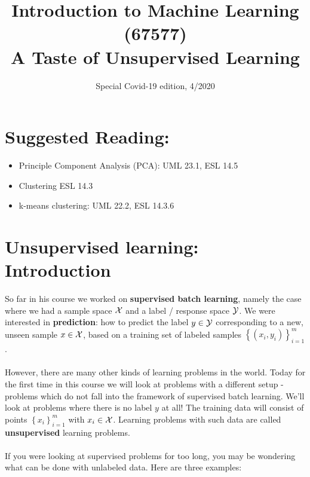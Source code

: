 \documentclass[11pt]{article}
\title{{\large{Introduction to Machine Learning (67577) \\
\vphantom{} A Taste of Unsupervised Learning}}}
\date{Special Covid-19 edition, 4/2020}
\begin{document}
\maketitle

\tableofcontents

\section*{Suggested Reading:}
\begin{itemize}
  \item Principle Component Analysis (PCA): UML 23.1, ESL 14.5
  \item Clustering ESL 14.3
  \item k-means clustering: UML 22.2, ESL 14.3.6
\end{itemize}

\section{Unsupervised learning: Introduction}

So far in his course we worked on {\bf supervised batch learning}, namely the case
where we had a sample space $\mathcal{X}$ and a label / response space $\mathcal{Y}$. We were
interested in {\bf prediction}: how to predict the label $y\in\mathcal{Y}$ corresponding
to a new, unseen
sample $x\in \mathcal{X}$, based on a training set of labeled samples 
$\left\{ (x_i,y_i) \right\}_{i=1}^m$.
\\~\\
However, there are many other kinds of learning problems in the world. Today for
the first time in this course we
will look at problems with a different setup - problems which do not fall into
the framework of supervised batch learning. We'll look at problems where there
is no label $y$ at all! The training data will consist of points
$\left\{ x_i \right\}_{i=1}^m$ with $x_i\in\mathcal{X}$. Learning problems with such data
are called {\bf unsupervised} learning problems.
\\~\\
If you were looking at supervised problems for too long, you may be wondering
what can be done with unlabeled data. Here are three examples:
\end{document}
